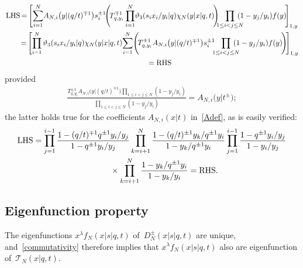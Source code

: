 \documentclass[pdftex]{sigma}%
\numberwithin{equation}{section}
\newcommand{\cT}{{\mathcal T}}
\begin{document}
\begin{gather*}
\text{LHS} \,{=}\, \Biggl[ \sum_{i=1}^N\! A_{N,i}\big(y|(q/t)^{\mp 1}\big)s_i^{\pm 1} \!
\Bigg(\! T_{q,y_i}^{\mp1} \prod_{i=1}^N\!\vartheta_3(s_ix_i/y_i|q)\chi_N(y|x|q,t)\!\Bigg)\!\!\!
 \prod_{1\leq i<j\leq N}\!\!\!\!\!(1-y_j/y_i)f(y)\!\Biggr]_{1,y}
 \\ \hphantom{\text{LHS}}
{}\,{=}\, \Biggl[\prod_{i=1}^N\vartheta_3(s_ix_i/y_i|q)\chi_N(y|x|q,t)
\!\sum_{i=1}^N\! \Bigg(\! T_{q,y_i}^{\pm 1} A_{N,i}\big(y|(q/t)^{\mp 1}\big)s_i^{\pm 1}\!\!\! \prod_{1\leq i<j\leq N}\!\!\!\!\!(1-y_j/y_i)f(y)\!\Bigg) \!\Biggr]_{1,y}
 \\ \hphantom{\text{LHS}}
{}=\text{RHS}
\end{gather*}
provided
\begin{gather*}
\frac{ T_{q,y_i}^{\pm 1}A_{N,i}\big(y|(q/t)^{\mp 1}\big) \prod_{1\leq i<j\leq N}(1-y_j/y_i)}{\prod_{1\leq i<j\leq N}(1-y_j/y_i)} = A_{N,i}\big(y|t^\pm\big) ;
\end{gather*}
the latter holds true for the coefficients $A_{N,i}(x|t)$ in~\eqref{Adef}, as is easily verified:
\begin{gather*}
\text{LHS} =
\prod_{j=1}^{i-1}\frac{1-(q/t)^{\mp 1}q^{\pm 1}y_i/y_j}{1-q^{\pm 1}y_i/y_j} \prod_{k=i+1}^N\frac{1-(q/t)^{\pm 1}y_k/q^{\pm 1}y_i}{1-y_k/q^{\pm 1}y_i}
 \prod_{j=1}^{i-1}\frac{1-q^{\pm 1}y_i/y_j}{1-y_i/y_j}
 \\ \hphantom{\text{LHS}=}
 {}\times\prod_{k=i+1}^N \frac{1-y_k/q^{\pm 1}y_i}{1-y_k/y_i}
=\text{RHS}.
\end{gather*}

\subsection{Eigenfunction property}
The eigenfunctions $x^\lambda f_N(x|s|q,t)$ of~$D^\pm_N(x|s|q,t)$ are unique, and~\eqref{commutativity} therefore implies that $x^\lambda f_N(x|s|q,t)$ also are eigenfunction of~$\cT_N(x|q,t)$.
\end{document}
